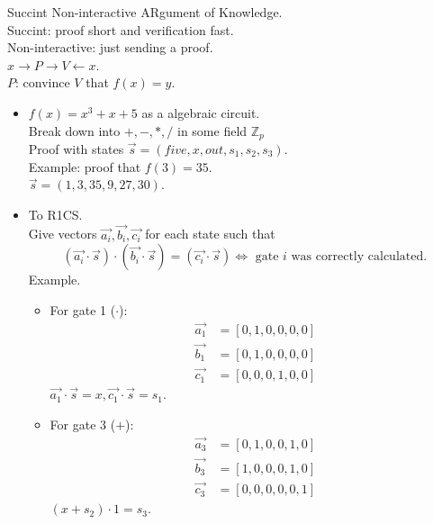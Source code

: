 \documentclass[a4paper, 12pt]{book}
\theoremstyle{definition}
\theoremstyle{remark}
\newcommand{\Z}{\mathbb{Z}}
\begin{document}
Succint Non-interactive ARgument of Knowledge. \\
Succint: proof short and verification fast. \\
Non-interactive: just sending a proof. \\
$x \rightarrow P \rightarrow V \leftarrow x$. \\
$P$: convince $V$ that $f(x) = y$.
\begin{itemize}
  \item $f(x) = x^3 + x + 5$ as a algebraic circuit. \\
    Break down into $+, -, *, /$ in some field $\Z_p$ \\
    Proof with states $\overrightarrow{s} = (five, x, out, s_1, s_2, s_3)$. \\
    Example: proof that $f(3) = 35$. \\
    $\overrightarrow{s} = (1, 3, 35, 9, 27, 30)$.
  \item To R1CS. \\
    Give vectors $\overrightarrow{a_i}, \overrightarrow{b_i}, \overrightarrow{c_i}$
    for each state such that
    \begin{equation*}
      (\overrightarrow{a_i} \cdot \overrightarrow{s}) \cdot
      (\overrightarrow{b_i} \cdot \overrightarrow{s}) =
      (\overrightarrow{c_i} \cdot \overrightarrow{s}) \iff \text{ gate $i$ was correctly calculated}.
    \end{equation*}
    Example.
    \begin{itemize}[label={}]
      \item For gate 1 ($\cdot$):
        \begin{align*}
          \overrightarrow{a_1} &= [0, 1, 0, 0, 0, 0] \\
          \overrightarrow{b_1} &= [0, 1, 0, 0, 0, 0] \\
          \overrightarrow{c_1} &= [0, 0, 0, 1, 0, 0]
        \end{align*}
        $\overrightarrow{a_1} \cdot \overrightarrow{s} = x, \overrightarrow{c_1} \cdot \overrightarrow{s} = s_1$.
      \item For gate 3 ($+$):
        \begin{align*}
          \overrightarrow{a_3} &= [0, 1, 0, 0, 1, 0] \\
          \overrightarrow{b_3} &= [1, 0, 0, 0, 1, 0] \\
          \overrightarrow{c_3} &= [0, 0, 0, 0, 0, 1]
        \end{align*}
        $(x + s_2) \cdot 1 = s_3$.

\end{itemize}
\end{itemize}
\end{document}
